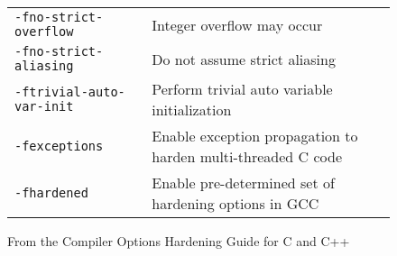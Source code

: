 \begin{figure}[ht]
\begin{longtable}[c]{p{} | p{}}
        \texttt{-fno-strict-overflow} & Integer overflow may occur\\
        \texttt{-fno-strict-aliasing} & Do not assume strict aliasing\\
        \texttt{-ftrivial-auto-var-init} & Perform trivial auto variable initialization\\
        \texttt{-fexceptions} & Enable exception propagation to harden multi-threaded C code\\
        \texttt{-fhardened} & Enable pre-determined set of hardening options in GCC\\
    \end{longtable}
    \caption{From the Compiler Options Hardening Guide for C and C++}
    \label{fig:hardening-options}
\end{figure}
        




